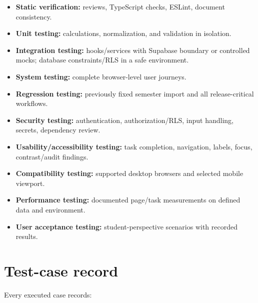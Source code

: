 \documentclass[
  10pt,
  a4paper,
  oneside]{report}
\providecommand{\tightlist}{%
  \setlength{\itemsep}{0pt}\setlength{\parskip}{0pt}}
\begin{document}
\begin{itemize}
\tightlist
\item
  \textbf{Static verification:} reviews, TypeScript checks, ESLint,
  document consistency.
\item
  \textbf{Unit testing:} calculations, normalization, and validation in
  isolation.
\item
  \textbf{Integration testing:} hooks/services with Supabase boundary or
  controlled mocks; database constraints/RLS in a safe environment.
\item
  \textbf{System testing:} complete browser-level user journeys.
\item
  \textbf{Regression testing:} previously fixed semester import and all
  release-critical workflows.
\item
  \textbf{Security testing:} authentication, authorization/RLS, input
  handling, secrets, dependency review.
\item
  \textbf{Usability/accessibility testing:} task completion, navigation,
  labels, focus, contrast/audit findings.
\item
  \textbf{Compatibility testing:} supported desktop browsers and
  selected mobile viewport.
\item
  \textbf{Performance testing:} documented page/task measurements on
  defined data and environment.
\item
  \textbf{User acceptance testing:} student-perspective scenarios with
  recorded results.
\end{itemize}

\section{Test-case record}\label{164-test-case-record}

Every executed case records:
\end{document}
